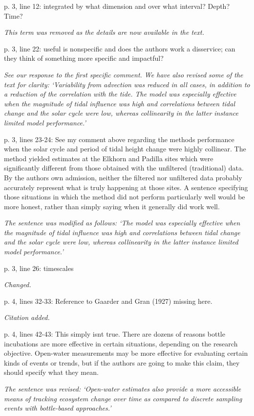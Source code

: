\documentclass[letterpaper,12pt]{article}\usepackage[]{graphicx}\usepackage[]{color}
\begin{document}
p. 3, line 12: integrated by what dimension and over what interval? Depth? Time?

{\it This term was removed as the details are now available in the text.}

p. 3, line 22: useful is nonspecific and does the authors work a disservice; can they think of
something more specific and impactful?

{\it See our response to the first specific comment.  We have also revised some of the text for clarity: `Variability from advection was reduced in all cases, in addition to a reduction of the correlation with the tide. The model was especially effective when the magnitude of tidal influence was high and correlations between tidal change and the solar cycle were low, whereas collinearity in the latter instance limited model performance.'}

p. 3, lines 23-24: See my comment above regarding the methods performance when the solar cycle and period of tidal height change were highly collinear. The method yielded estimates at the Elkhorn and Padilla sites which were significantly different from those obtained with the unfiltered (traditional) data. By the authors own admission, neither the filtered nor unfiltered data probably accurately represent what is truly happening at those sites. A sentence specifying those situations in which the method did not perform particularly well would be more honest, rather than simply saying when it generally did work well.

{\it The sentence was modified as follows: `The model was especially effective when the magnitude of tidal influence was high and correlations between tidal change and the solar cycle were low, whereas collinearity in the latter instance limited model performance.'
}

p. 3, line 26: timescales

{\it Changed.}

p. 4, lines 32-33: Reference to Gaarder and Gran (1927) missing here.

{\it Citation added.}

p. 4, lines 42-43: This simply isnt true. There are dozens of reasons bottle incubations are more effective in certain situations, depending on the research objective. Open-water measurements may be more effective for evaluating certain kinds of events or trends, but if the authors are going to make this claim, they should specify what they mean.

{\it The sentence was revised: `Open-water estimates also provide a more accessible means of tracking ecosystem change over time as compared to discrete sampling events with bottle-based approaches.'}
\end{document}
